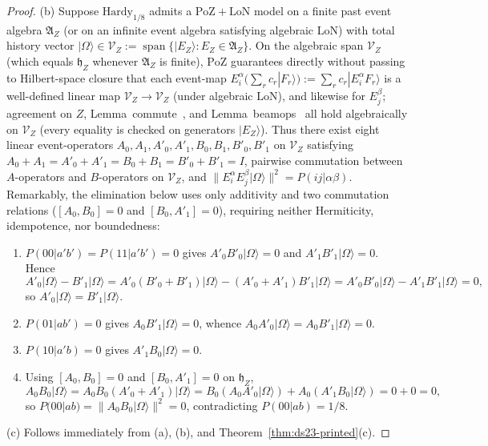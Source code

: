 \documentclass[11pt,a4paper]{article}
\theoremstyle{definition}
\theoremstyle{remark}
\newcommand{\EA}{\mathfrak{A}}
\newcommand{\PoZ}{\mathrm{PoZ}}
\newcommand{\LoN}{\mathrm{LoN}}
\newcommand{\ket}[1]{|#1\rangle}
\newcommand{\norm}[1]{\|#1\|}
\begin{document}
\begin{proof}
(b) Suppose $\mathrm{Hardy}_{1/8}$ admits a $\PoZ+\LoN$ model on a finite past event algebra $\EA_Z$ (or on an infinite event algebra satisfying algebraic $\LoN$) with total history vector $\ket{\Omega} \in \mathcal{V}_Z := \operatorname{span}\{\ket{E_Z} : E_Z \in \EA_Z\}$. On the algebraic span $\mathcal{V}_Z$ (which equals $\mathfrak{h}_Z$ whenever $\EA_Z$ is finite), $\PoZ$ guarantees directly without passing to Hilbert-space closure that each event-map $E^\alpha_i(\sum_r c_r \ket{F_r}) := \sum_r c_r \ket{E^\alpha_i F_r}$ is a well-defined linear map $\mathcal{V}_Z \to \mathcal{V}_Z$ (under algebraic $\LoN$), and likewise for $E^\beta_j$; agreement on $Z$, Lemma~commute~\cite[L897--922]{DowkerSorkin2023}, and Lemma~beamops~\cite[L1197--1215]{DowkerSorkin2023} all hold algebraically on $\mathcal{V}_Z$ (every equality is checked on generators $\ket{E_Z}$). Thus there exist eight linear event-operators $A_0, A_1, A'_0, A'_1, B_0, B_1, B'_0, B'_1$ on $\mathcal{V}_Z$ satisfying $A_0 + A_1 = A'_0 + A'_1 = B_0 + B_1 = B'_0 + B'_1 = I$, pairwise commutation between $A$-operators and $B$-operators on $\mathcal{V}_Z$, and $\norm{E^\alpha_i E^\beta_j \ket{\Omega}}^2 = P(ij|\alpha\beta)$. Remarkably, the elimination below uses only additivity and two commutation relations ($[A_0,B_0]=0$ and $[B_0,A'_1]=0$), requiring neither Hermiticity, idempotence, nor boundedness:
\begin{enumerate}[leftmargin=*,nosep]
\item $P(00|a'b') = P(11|a'b') = 0$ gives $A'_0 B'_0 \ket{\Omega} = 0$ and $A'_1 B'_1 \ket{\Omega} = 0$. Hence
\[
A'_0 \ket{\Omega} - B'_1 \ket{\Omega}
= A'_0(B'_0 + B'_1)\ket{\Omega} - (A'_0 + A'_1)B'_1\ket{\Omega}
= A'_0 B'_0 \ket{\Omega} - A'_1 B'_1 \ket{\Omega} = 0,
\]
so $A'_0 \ket{\Omega} = B'_1 \ket{\Omega}$.
\item $P(01|ab') = 0$ gives $A_0 B'_1 \ket{\Omega} = 0$, whence $A_0 A'_0 \ket{\Omega} = A_0 B'_1 \ket{\Omega} = 0$.
\item $P(10|a'b) = 0$ gives $A'_1 B_0 \ket{\Omega} = 0$.
\item Using $[A_0, B_0] = 0$ and $[B_0, A'_1] = 0$ on $\mathfrak{h}_Z$,
\[
A_0 B_0 \ket{\Omega} = A_0 B_0 (A'_0 + A'_1)\ket{\Omega}
= B_0 (A_0 A'_0 \ket{\Omega}) + A_0 (A'_1 B_0 \ket{\Omega}) = 0 + 0 = 0,
\]
so $P(00|ab) = \norm{A_0 B_0 \ket{\Omega}}^2 = 0$, contradicting $P(00|ab) = 1/8$.
\end{enumerate}
(c) Follows immediately from (a), (b), and Theorem~\ref{thm:ds23-printed}(c).
\end{proof}
\end{document}
